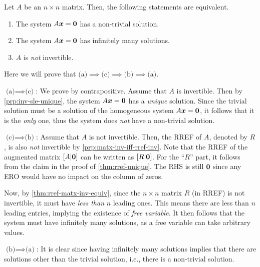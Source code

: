 \begin{enumerate}
\begin{proposition}
\label{prp:homo-same-var-eqs-equiv}
Let \(A\) be an \(n\times n\) matrix. Then, the following statements are
equivalent.
\begin{enumerate}
\item The system \(A\vb*{x}=\vb*{0}\) has a non-trivial solution.
\item The system \(A\vb*{x}=\vb*{0}\) has infinitely many solutions.
\item \(A\) is \emph{not} invertible.
\end{enumerate}
\end{proposition}
\begin{pf}
Here we will prove that \(\text{(a)}\implies \text{(c)}\implies
\text{(b)}\implies \text{(a)}\).

\underline{\(\text{(a)}\implies \text{(c)}\)}: We prove by contrapositive.
Assume that \(A\) is invertible. Then by \cref{prp:inv-sle-unique}, the system
\(A\vb*{x}=\vb*{0}\) has a \emph{unique} solution. Since the trivial solution
must be a solution of the homogeneous system \(A\vb*{x}=\vb*{0}\), it follows
that it is the \emph{only} one, thus the system does \emph{not} have a
non-trivial solution.

\underline{\(\text{(c)}\implies\text{(b)}\)}: Assume that \(A\) is not
invertible. Then, the RREF of \(A\), denoted by \(R\), is also \emph{not} invertible
by \cref{prp:matx-inv-iff-rref-inv}. Note that the RREF of the augmented matrix
\([A|\vb*{0}]\) can be written as \([R|\vb*{0}]\). For the ``\(R\)'' part, it
follows from the claim in the proof of \cref{thm:rref-unique}. The RHS is still
\(\vb*{0}\) since any ERO would have no impact on the column of zeros.

Now, by \cref{thm:rref-matx-inv-equiv}, since the \(n\times n\) matrix \(R\)
(in RREF) is not invertible, it must have \emph{less than} \(n\) leading ones.
This means there are less than \(n\) leading entries, implying the existence of
\emph{free variable}. It then follows that the system must have infinitely many
solutions, as a free variable can take arbitrary values.

\underline{\(\text{(b)}\implies\text{(a)}\)}: It is clear since having
infinitely many solutions implies that there are solutions other than the trivial
solution, i.e., there is a non-trivial solution.
\end{pf}
\end{enumerate}
